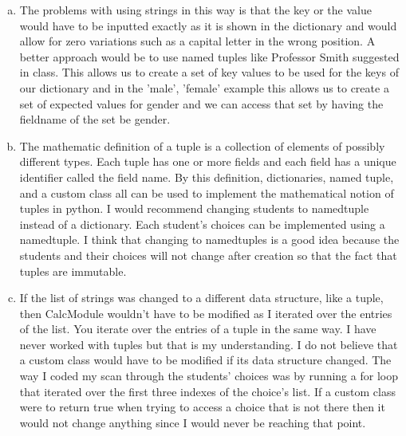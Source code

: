 \documentclass[12pt]{article}
\begin{document}
\begin{enumerate}[(a)]
\item The problems with using strings in this way is that the key or the value would have to be inputted exactly as it is shown in the dictionary
and would allow for zero variations such as a capital letter in the wrong position. A better approach would be to use named tuples like Professor 
Smith suggested in class. This allows us to create a set of key values to be used for the keys of our dictionary and in the 'male', 'female' example
this allows us to create a set of expected values for gender and we can access that set by having the fieldname of the set be gender.

\item The mathematic definition of a tuple is a collection of elements of possibly different types. Each tuple has one or more fields and each field
has a unique identifier called the field name. By this definition, dictionaries, named tuple, and a custom class all can be used to implement the 
mathematical notion of tuples in python. I would recommend changing students to namedtuple instead of a dictionary. Each student's choices can be 
implemented using a namedtuple. I think that changing to namedtuples is a good idea because the students and their choices will not change after 
creation so that the fact that tuples are immutable.

\item If the list of strings was changed to a different data structure, like a tuple, then CalcModule wouldn't have to be modified as I iterated over 
the entries of the list. You iterate over the entries of a tuple in the same way. I have never worked with tuples but that is my understanding. I do
not believe that a custom class would have to be modified if its data structure changed. The way I coded my scan through the students' choices was by
running a for loop that iterated over the first three indexes of the choice's list. If a custom class were to return true when trying to access a choice
that is not there then it would not change anything since I would never be reaching that point.

\end{enumerate}

\newpage

\lstset{language=Python, basicstyle=\tiny, breaklines=true, showspaces=false,
  showstringspaces=false, breakatwhitespace=true}

\def\thesection{\Alph{section}}
\end{document}
